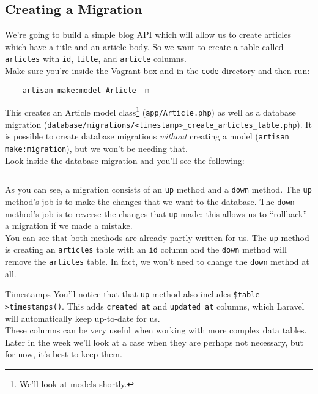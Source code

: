 \subsection{Creating a Migration}

We're going to build a simple blog API which will allow us to create articles which have a title and an article body. So we want to create a table called \texttt{articles} with \texttt{id}, \texttt{title}, and \texttt{article} columns.
\\

Make sure you're inside the Vagrant box and in the \texttt{code} directory and then run:

\begin{verbatim}
    artisan make:model Article -m
\end{verbatim}

This creates an Article model class\footnote{We'll look at models shortly.} (\texttt{app/Article.php}) as well as a database migration (\texttt{database/migrations/<timestamp>\_create\_articles\_table.php}). It is possible to create database migrations \textit{without} creating a model (\texttt{artisan make:migration}), but we won't be needing that.
\\

Look inside the database migration and you'll see the following:

\inputminted{php}{02/figures/02/01-migration.php}

As you can see, a migration consists of an \texttt{up} method and a \texttt{down} method. The \texttt{up} method's job is to make the changes that we want to the database. The \texttt{down} method's job is to reverse the changes that \texttt{up} made: this allows us to ``rollback'' a migration if we made a mistake.
\\

You can see that both methods are already partly written for us. The \texttt{up} method is creating an \texttt{articles} table with an \texttt{id} column and the \texttt{down} method will remove the \texttt{articles} table. In fact, we won't need to change the \texttt{down} method at all.

\begin{infobox}{Timestamps}
    You'll notice that that \texttt{up} method also includes \texttt{\$table->timestamps()}. This adds \texttt{created\_at} and \texttt{updated\_at} columns, which Laravel will automatically keep up-to-date for us.
    \\

    These columns can be very useful when working with more complex data tables. Later in the week we'll look at a case when they are perhaps not necessary, but for now, it's best to keep them.
\end{infobox}

